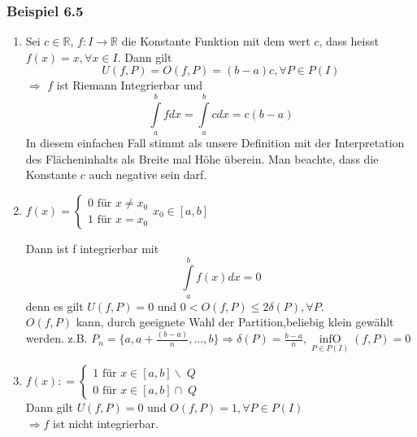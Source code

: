 \subsubsection*{Beispiel 6.5}
\begin{enumerate}[1)]
\item Sei $c\in \mathbb{R}$, $f:I\rightarrow \mathbb{R}$ die Konstante Funktion mit dem wert $c$, dass heisst $f(x)=x, \forall x\in I$. Dann gilt $$U(f,P)=O(f,P)=(b-a)c, \forall P\in P(I)$$ $\Rightarrow$ $f$ ist Riemann Integrierbar und $$\int\limits_a^b {fdx}  = \int\limits_a^b {cdx = c(b - a)} $$ In diesem einfachen Fall stimmt als unsere Definition mit der Interpretation des Flächeninhalts als Breite mal Höhe überein. Man beachte, dass die Konstante $c$ auch negative sein darf. 
\item $f(x) = \left\{ {\begin{array}{*{20}{c}}
{0{\text{ für }}x \ne {x_0}}\\
{1{\text{ für }}x = {x_0}}
\end{array}} \right.{x_0} \in [a,b]$

\begin{center}
\end{center}



Dann ist f integrierbar mit $$\int\limits_a^b {f(x)dx = 0}$$ denn es gilt $U(f,P)=0$ und $0<O(f,P) \leq 2\delta(P), \forall P$.\\

$O(f,P)$ kann, durch geeignete Wahl der Partition,beliebig klein gewählt werden. z.B. $P_n=\{a,a+\frac{{(b - a)}}{n},\dots,b\} \Rightarrow \delta (P)=\frac{b-a}{n}, \mathop {\inf O}\limits_{P \in P(I)} (f,P) = 0$

\item $f(x): = \left\{ {\begin{array}{*{20}{c}}
{1{\text{ für }}x \in [a,b]\backslash \;Q}\\
{0{\text{ für }}x \in [a,b] \cap \;Q}
\end{array}} \right.$
\\

Dann gilt $U(f,P)=0$ und $O(f,P)=1, \forall P\in P(I)$\\
$\Rightarrow f$ ist nicht integrierbar. 
\end{enumerate}

